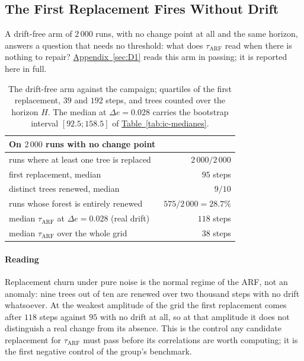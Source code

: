 \documentclass[10pt,conference]{IEEEtran}
\theoremstyle{definition}
\begin{document}
\subsection{The First Replacement Fires Without Drift}
\label{sec:e:nodrift}

A drift-free arm of $2\,000$ runs, with no change point at all and the same horizon,
answers a question that needs no threshold: what does
$\tau_{\mathrm{ARF}}$ read when there is nothing to repair? \hyperref[sec:D1]{Appendix~\ref*{sec:D1}} reads this arm in passing; it is reported here in full.

\begin{table}[t]
\centering
\caption{The drift-free arm against the campaign; quartiles of the first replacement,
$39$ and $192$ steps, and trees counted over the horizon $H$. The median at
$\Delta e = 0.028$ carries the bootstrap interval $[92.5 ; 158.5]$ of
\hyperref[tab:ic-medianes]{Table~\ref*{tab:ic-medianes}}.}
\label{tab:nodrift}
\small
\begin{tabular}{lr}
\toprule
On $2\,000$ runs with no change point & \\
\midrule
runs where at least one tree is replaced & $2\,000/2\,000$ \\
first replacement, median & $95$ steps \\
distinct trees renewed, median & $9/10$ \\
runs whose forest is entirely renewed & $575/2\,000 = 28.7\%$ \\
\midrule
median $\tau_{\mathrm{ARF}}$ at $\Delta e = 0.028$ (real drift) & $118$ steps \\
median $\tau_{\mathrm{ARF}}$ over the whole grid & $38$ steps \\
\bottomrule
\end{tabular}

\end{table}

\paragraph{Reading} Replacement churn under pure noise is the normal regime of the ARF,
not an anomaly: nine trees out of ten are renewed over two thousand steps with no drift
whatsoever. At the weakest amplitude of the grid the first replacement comes after $118$ steps against
$95$ with no drift at all, so at that amplitude it does not distinguish a real change from
its absence. This is the control any candidate replacement for $\tau_{\mathrm{ARF}}$ must
pass before its correlations are worth computing; it is the first negative control of the
group's benchmark.
\end{document}
